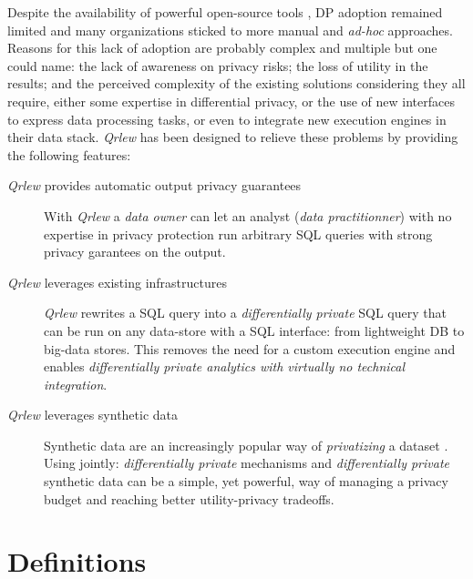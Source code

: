 \documentclass[letterpaper]{article} %
\newcommand{\qrlew}{\emph{Qrlew}}
\begin{document}
Despite the availability of powerful open-source tools \cite{kotsogiannis2019privatesql, diffprivlib, OpenDP, PipelineDP, ZetaSQL, PrivacyOnBeam, johnson2020chorus, berghel2022tumult, yousefpour2021opacus}, DP adoption remained limited and many organizations sticked to more manual and \emph{ad-hoc} approaches.
Reasons for this lack of adoption are probably complex and multiple but one could name: the lack of awareness on privacy risks; the loss of utility in the results; and the perceived complexity of the existing solutions considering they all require, either some expertise in differential privacy, or the use of new interfaces to express data processing tasks, or even to integrate new execution engines in their data stack.
\qrlew{} \cite{Grislain_Qrlew_2023} has been designed to relieve these problems by providing the following features:
\begin{description}
    \item[\qrlew{} provides automatic output privacy guarantees]
    With \qrlew{} a \emph{data owner} can let an analyst (\emph{data practitionner}) with no expertise in privacy protection run arbitrary SQL queries with strong privacy garantees on the output.
    \item[\qrlew{} leverages existing infrastructures]
    \qrlew{} rewrites a SQL query into a \emph{differentially private} SQL query that can be run on any data-store with a SQL interface: from lightweight DB to big-data stores.
This removes the need for a custom execution engine and enables \emph{differentially private analytics with virtually no technical integration}.
    \item[\qrlew{} leverages synthetic data]
    Synthetic data are an increasingly popular way of \emph{privatizing} a dataset \cite{bowen2019comparative, mckenna2021winning, canale2022generative, sablayrolles2023privately, castellon2023dp}. Using jointly: \emph{differentially private} mechanisms and \emph{differentially private} synthetic data can be a simple, yet powerful, way of managing a privacy budget and reaching better utility-privacy tradeoffs.
\end{description}


\section{Definitions}
\end{document}
